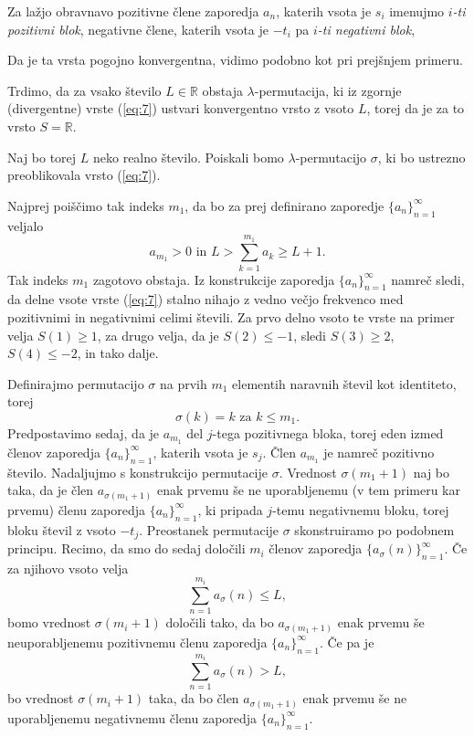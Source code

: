 \documentclass[12pt,a4paper,reqno]{amsart}
\theoremstyle{definition} %
\theoremstyle{plain} %
\newcommand{\R}{\mathbb R}
\begin{document}
Za lažjo obravnavo pozitivne člene zaporedja $a_n$, katerih vsota je $s_i$ imenujmo \emph{$i$-ti pozitivni blok}, negativne člene, katerih vsota je $-t_i$ pa \emph{$i$-ti negativni blok},

Da je ta vrsta pogojno konvergentna, vidimo podobno kot pri prejšnjem primeru. %

Trdimo, da za vsako število $L\in \R$ obstaja $\lambda$-permutacija, ki iz zgornje (divergentne) vrste (\ref{eq:7}) ustvari konvergentno vrsto z vsoto $L$, torej da je za to vrsto $S=\R$. %

Naj bo torej $L$ neko realno število. Poiskali bomo $\lambda$-permutacijo $\sigma$, ki bo ustrezno preoblikovala vrsto (\ref{eq:7}). 

Najprej poiščimo tak indeks $m_1$, da bo za prej definirano zaporedje $\{a_n\}_{n=1}^{\infty}$ veljalo $$a_{m_1}>0\textrm{ in }L>\sum_{k=1}^{m_1}a_k \geq L+1.$$ Tak indeks $m_1$ zagotovo obstaja. Iz konstrukcije zaporedja $\{a_n\}_{n=1}^{\infty}$ namreč sledi, da delne vsote vrste (\ref{eq:7}) stalno nihajo z vedno večjo frekvenco med pozitivnimi in negativnimi celimi števili. Za prvo delno vsoto te vrste na primer velja $S(1)\geq 1$, za drugo velja, da je $S(2)\leq -1$, sledi $S(3) \geq 2$, $S(4) \leq -2$, in tako dalje.

Definirajmo permutacijo $\sigma$ na prvih $m_1$ elementih naravnih števil kot identiteto, torej $$\sigma(k)=k\textrm{ za }k\leq m_1.$$ Predpostavimo sedaj, da je $a_{m_1}$ del $j$-tega pozitivnega bloka, torej eden izmed členov zaporedja $\{a_n\}_{n=1}^{\infty}$, katerih vsota je $s_j$. Člen $a_{m_1}$ je namreč pozitivno število. Nadaljujmo s konstrukcijo permutacije $\sigma$. Vrednost $\sigma(m_1+1)$ naj bo taka, da je člen $a_{\sigma(m_1+1)}$ enak prvemu še ne uporabljenemu (v tem primeru kar prvemu) členu zaporedja $\{a_n\}_{n=1}^{\infty}$, ki pripada $j$-temu negativnemu bloku, torej bloku števil z vsoto $-t_j$. 
Preostanek permutacije $\sigma$ skonstruiramo po podobnem principu. Recimo, da smo do sedaj določili $m_i$ členov zaporedja $\{a_\sigma(n)\}_{n=1}^{\infty}$. Če za njihovo vsoto velja $$\sum^{m_i}_{n=1}a_\sigma(n) \leq L,$$ bomo vrednost $\sigma(m_i+1)$ določili tako, da bo $a_{\sigma(m_1+1)}$ enak prvemu še neuporabljenemu pozitivnemu členu zaporedja $\{a_n\}_{n=1}^{\infty}$. Če pa je $$\sum^{m_i}_{n=1}a_\sigma(n) > L,$$ bo vrednost $\sigma(m_i+1)$ taka, da bo člen $a_{\sigma(m_1+1)}$ enak prvemu še ne uporabljenemu negativnemu členu zaporedja $\{a_n\}_{n=1}^{\infty}$.%
\end{document}
